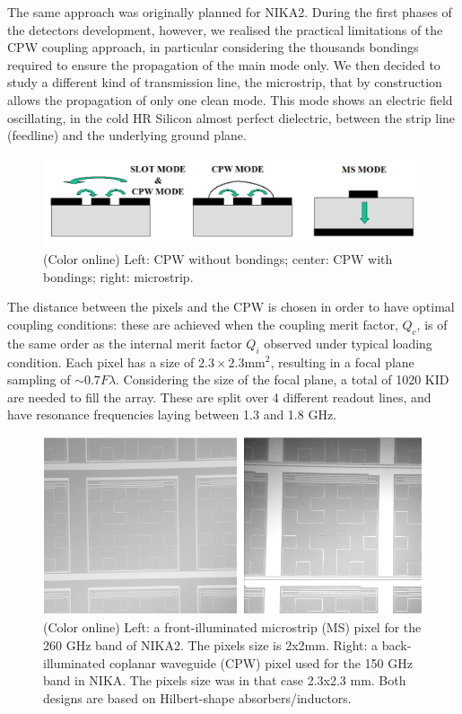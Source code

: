 \documentclass[]{aa} %
\begin{document}
The same approach was originally planned for NIKA2. During the first phases of the detectors development, however, we realised the practical limitations of the CPW coupling approach, in particular considering the thousands bondings required to ensure the propagation of the main mode only. We then decided to study a different kind of transmission line, the microstrip, that by construction allows the propagation of only one clean mode. This mode shows an electric field oscillating, in the cold HR Silicon almost perfect dielectric, between the strip line (feedline) and the underlying ground plane. 

\begin{figure}[h]
   \centering
    \includegraphics[width=.95\linewidth]{CPWvsMS.png}
      \caption{(Color online) Left: CPW without bondings; center: CPW with bondings; right: microstrip.}
         \label{CPWvsMS}
\end{figure}

The distance between the pixels and the CPW is chosen in order to have optimal coupling conditions: these are achieved when the coupling merit factor, $Q_c$, is of the same order as the internal merit factor $Q_i$ observed under typical loading condition. Each pixel has a size of $2.3\times2.3\textrm{mm}^2$, resulting in a focal plane sampling of $\sim 0.7 F\lambda$. Considering the size of the focal plane, a total of 1020 KID are needed to fill the array. These are split over 4 different readout lines, and have resonance frequencies laying between 1.3 and 1.8 GHz.

\begin{figure}[h]
   \centering
    \includegraphics[width=.95\linewidth]{CPWeMS.png}
      \caption{(Color online) Left: a front-illuminated microstrip (MS) pixel for the 260 GHz band of NIKA2. The pixels size is 2x2mm. Right: a back-illuminated coplanar waveguide (CPW) pixel used for the 150 GHz band in NIKA. The pixels size was in that case 2.3x2.3 mm. Both designs are based on Hilbert-shape absorbers/inductors.}
         \label{Pixels}
\end{figure}
\end{document}
